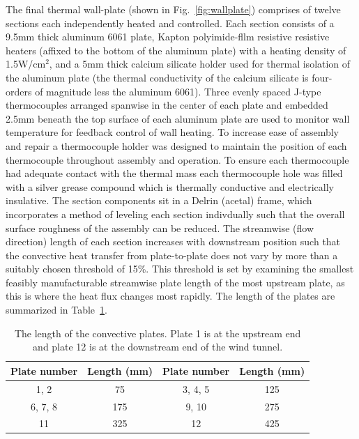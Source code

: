The final thermal wall-plate (shown in Fig.~\ref{fig:wallplate}) comprises of twelve sections each independently heated and controlled. 
Each section consists of a 9.5mm thick aluminum 6061 plate, Kapton polyimide-fllm resistive resistive heaters (affixed to the bottom of the aluminum plate) with a heating density of 1.5W/cm$^2$, and a 5mm thick calcium silicate holder used for thermal isolation of the aluminum plate (the thermal conductivity of the calcium silicate is four-orders of magnitude less the aluminum 6061).
Three evenly spaced J-type thermocouples arranged spanwise in the center of each plate and embedded 2.5mm beneath the top surface of each aluminum plate are used to monitor wall temperature for feedback control of wall heating. 
To increase ease of assembly and repair a thermocouple holder was designed to maintain the position of each thermocouple throughout assembly and operation.
To ensure each thermocouple had adequate contact with the thermal mass each thermocouple hole was filled with a silver grease compound which is thermally conductive and electrically insulative.
The section components sit in a Delrin (acetal) frame, which incorporates a method of leveling each section indivdually such that the overall surface roughness of the assembly can be reduced.
The streamwise (flow direction) length of each section increases with downstream position such that the convective heat transfer from plate-to-plate does not vary by more than a suitably chosen threshold of 15\%.
This threshold is set by examining the smallest feasibly manufacturable streamwise plate length of the most upstream plate, as this is where the heat flux changes most rapidly. 
The length of the plates are summarized in Table~\ref{tab:plate}. 

\begin{table}[t!] 
\centering
\caption{\indent The length of the convective plates. Plate 1 is at the upstream end and plate 12 is at the downstream end of the wind tunnel.}
\begin{tabular}{|c|c|c|c|}
	\hline
	 Plate number& Length (mm) & Plate number& Length (mm)\\ \hline
	1, 2& 75 & 3, 4, 5 & 125 \\ \hline
	6, 7, 8 & 175 & 9, 10 & 275 \\ \hline
	11 & 325 & 12 & 425 \\ \hline                                                       
\end{tabular}
\label{tab:plate}
\end{table}

